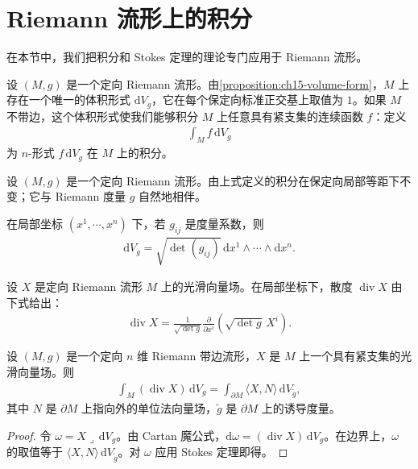 \documentclass[../../main.tex]{subfiles}
\begin{document}
\section{Riemann 流形上的积分}\label{section:ch16-integration-on-riemannian-manifolds}

在本节中，我们把积分和 Stokes 定理的理论专门应用于 Riemann 流形。

设 $(M,g)$ 是一个定向 Riemann 流形。由\cref{proposition:ch15-volume-form}，$M$ 上存在一个唯一的体积形式 $\mathrm{d}V_g$，它在每个保定向标准正交基上取值为 $1$。如果 $M$ 不带边，这个体积形式使我们能够积分 $M$ 上任意具有紧支集的连续函数 $f$：定义
\begin{align*}
\int_M f\,\mathrm{d}V_g
\end{align*}
为 $n$-形式 $f\,\mathrm{d}V_g$ 在 $M$ 上的积分。

\begin{proposition}[Riemann 密度]\label{proposition:ch16-riemannian-density}
设 $(M,g)$ 是一个定向 Riemann 流形。由上式定义的积分在保定向局部等距下不变；它与 Riemann 度量 $g$ 自然地相伴。
\end{proposition}

在局部坐标 $(x^1,\cdots ,x^n)$ 下，若 $g_{ij}$ 是度量系数，则
\begin{align*}
\mathrm{d}V_g=\sqrt{\det(g_{ij})}\,\mathrm{d}x^1\wedge\cdots\wedge\mathrm{d}x^n.
\end{align*}

\begin{lemma}\label{lemma:ch16-divergence-coord}
设 $X$ 是定向 Riemann 流形 $M$ 上的光滑向量场。在局部坐标下，散度 $\operatorname{div}X$ 由下式给出：
\begin{align*}
\operatorname{div}X=\frac{1}{\sqrt{\det g}}\frac{\partial}{\partial x^i}\left(\sqrt{\det g}\,X^i\right).
\end{align*}
\end{lemma}

\begin{theorem}[散度定理]\label{theorem:ch16-divergence-theorem}
设 $(M,g)$ 是一个定向 $n$ 维 Riemann 带边流形，$X$ 是 $M$ 上一个具有紧支集的光滑向量场。则
\begin{align}
\int_M(\operatorname{div}X)\,\mathrm{d}V_g=\int_{\partial M}\langle X,N\rangle\,\mathrm{d}V_{\widetilde g},
\end{align}
其中 $N$ 是 $\partial M$ 上指向外的单位法向量场，$\widetilde g$ 是 $\partial M$ 上的诱导度量。
\end{theorem}

\begin{proof}
令 $\omega=X\lrcorner\,\mathrm{d}V_g$。由 Cartan 魔公式，$\mathrm{d}\omega=(\operatorname{div}X)\,\mathrm{d}V_g$。在边界上，$\omega$ 的取值等于 $\langle X,N\rangle\,\mathrm{d}V_{\widetilde g}$。对 $\omega$ 应用 Stokes 定理即得。
\end{proof}
\end{document}
